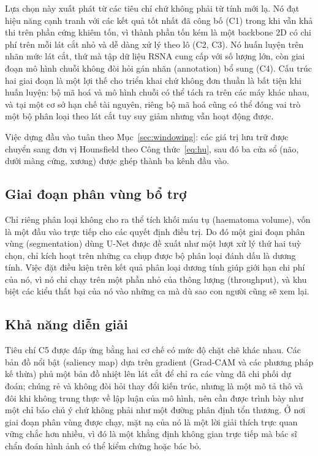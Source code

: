 Lựa chọn này xuất phát từ các tiêu chí chứ không phải từ tính mới lạ. Nó đạt
hiệu năng cạnh tranh với các kết quả tốt nhất đã công bố (C1) trong khi vẫn khả
thi trên phần cứng khiêm tốn, vì thành phần tốn kém là một backbone 2D có chi phí
trên mỗi lát cắt nhỏ và dễ dàng xử lý theo lô (C2, C3). Nó huấn luyện trên nhãn
mức lát cắt, thứ mà tập dữ liệu RSNA cung cấp với số lượng lớn, còn giai đoạn mô
hình chuỗi không đòi hỏi gán nhãn (annotation) bổ sung (C4). Cấu trúc hai giai
đoạn là một lợi thế cho triển khai chứ không đơn thuần là bất tiện khi huấn
luyện: bộ mã hoá và mô hình chuỗi có thể tách ra trên các máy khác nhau, và tại
một cơ sở hạn chế tài nguyên, riêng bộ mã hoá cũng có thể đóng vai trò một bộ
phân loại theo lát cắt tuy suy giảm nhưng vẫn hoạt động được.

Việc dựng đầu vào tuân theo Mục~\ref{sec:windowing}: các giá trị lưu trữ được
chuyển sang đơn vị Hounsfield theo Công thức~\ref{eq:hu}, sau đó ba cửa sổ (não,
dưới màng cứng, xương) được ghép thành ba kênh đầu vào.

\subsection{Giai đoạn phân vùng bổ trợ}

Chỉ riêng phân loại không cho ra thể tích khối máu tụ (haematoma volume), vốn là
một đầu vào trực tiếp cho các quyết định điều trị. Do đó một giai đoạn phân vùng
(segmentation) dùng U-Net được đề xuất như một lượt xử lý thứ hai tuỳ chọn, chỉ
kích hoạt trên những ca chụp được bộ phân loại đánh dấu là dương tính. Việc đặt
điều kiện trên kết quả phân loại dương tính giúp giới hạn chi phí của nó, vì nó
chỉ chạy trên một phần nhỏ của thông lượng (throughput), và khu biệt các kiểu
thất bại của nó vào những ca mà dù sao con người cũng sẽ xem lại.

\subsection{Khả năng diễn giải}

Tiêu chí C5 được đáp ứng bằng hai cơ chế có mức độ chặt chẽ khác nhau. Các bản
đồ nổi bật (saliency map) dựa trên gradient (Grad-CAM và các phương pháp kế
thừa) phủ một bản đồ nhiệt lên lát cắt để chỉ ra các vùng đã chi phối dự đoán;
chúng rẻ và không đòi hỏi thay đổi kiến trúc, nhưng là một mô tả thô và đôi khi
không trung thực về lập luận của mô hình, nên cần được trình bày như một chỉ báo
chú ý chứ không phải như một đường phân định tổn thương. Ở nơi giai đoạn phân
vùng được chạy, mặt nạ của nó là một lời giải thích trực quan vững chắc hơn
nhiều, vì đó là một khẳng định không gian trực tiếp mà bác sĩ chẩn đoán hình ảnh
có thể kiểm chứng hoặc bác bỏ.

